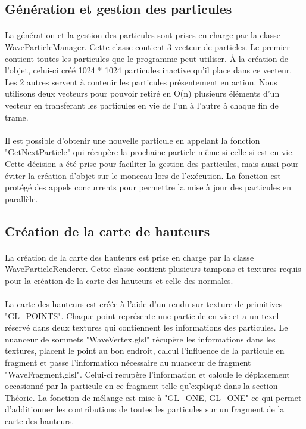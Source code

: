 \documentclass[a4paper, 12pt]{article} %
\begin{document}
\subsection{Génération et gestion des particules}
	\paragraph{}
	La génération et la gestion des particules sont prises en charge par la classe WaveParticleManager. Cette classe contient 3 vecteur de particles.
	Le premier contient toutes les particules que le programme peut utiliser. À la création de l'objet, celui-ci créé 1024 * 1024 particules inactive 
	qu'il place dans ce vecteur. Les 2 autres servent à contenir les particules présentement en action. Nous utilisons deux vecteurs pour pouvoir 
	retiré en O(n) plusieurs éléments d'un vecteur en transferant les particules en vie de l'un à l'autre à chaque fin de trame. 
    
	\paragraph{}
	Il est possible d'obtenir une nouvelle particule en appelant la fonction "GetNextParticle" qui récupère la prochaine particle même si celle si est en vie.
	Cette décision a été prise pour faciliter la gestion des particules, mais aussi pour éviter la création d'objet sur le monceau lors de l'exécution. La 
	fonction est protégé des appels concurrents pour permettre la mise à jour des particules en parallèle.
\subsection{Création de la carte de hauteurs}
	\paragraph{}
	La création de la carte des hauteurs est prise en charge par la classe WaveParticleRenderer. Cette classe contient plusieurs tampons et textures requis
	pour la création de la carte des hauteurs et celle des normales.
	
	\paragraph{}
	La carte des hauteurs est créée à l'aide d'un rendu sur texture de primitives "GL\_POINTS". Chaque point représente une particule en vie et a un texel réservé
	dans deux textures qui contiennent les informations des particules. Le nuanceur de sommets "WaveVertex.glsl" récupère les informations dans les textures, 
	placent le point au bon endroit, calcul l'influence de la particule en fragment et passe l'information nécessaire au nuanceur de fragment "WaveFragment.glsl".
	Celui-ci recupère l'information et calcule le déplacement occasionné par la particule en ce fragment telle qu'expliqué dans la section Théorie. La fonction 
	de mélange est mise à "GL\_ONE, GL\_ONE" ce qui permet d'additionner les contributions de toutes les particules sur un fragment de la carte des hauteurs.
\end{document}
